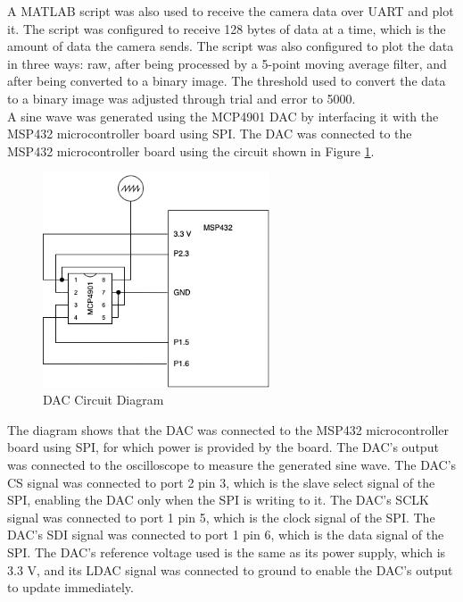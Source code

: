 \documentclass[CMPE]{KGCOEReport}
\begin{document}
A MATLAB script was also used to receive the camera data over UART and plot it. The script was configured to receive 128 bytes of data at a time, which is the amount of data the camera sends. The script was also configured to plot the data in three ways: raw, after being processed by a 5-point moving average filter, and after being converted to a binary image. The threshold used to convert the data to a binary image was adjusted through trial and error to 5000.\\

A sine wave was generated using the MCP4901 DAC by interfacing it with the MSP432 microcontroller board using SPI. The DAC was connected to the MSP432 microcontroller board using the circuit shown in Figure \ref{fig:dacDiagram}.

\begin{figure}[H]
    \centering
    \includegraphics[width=0.6\textwidth]{dacDiagram.png}
    \caption{DAC Circuit Diagram}
    \label{fig:dacDiagram}
\end{figure}

The diagram shows that the DAC was connected to the MSP432 microcontroller board using SPI, for which power is provided by the board. The DAC's output was connected to the oscilloscope to measure the generated sine wave. The DAC's CS signal was connected to port 2 pin 3, which is the slave select signal of the SPI, enabling the DAC only when the SPI is writing to it. The DAC's SCLK signal was connected to port 1 pin 5, which is the clock signal of the SPI. The DAC's SDI signal was connected to port 1 pin 6, which is the data signal of the SPI. The DAC's reference voltage used is the same as its power supply, which is 3.3 V, and its LDAC signal was connected to ground to enable the DAC's output to update immediately.\\
\end{document}
